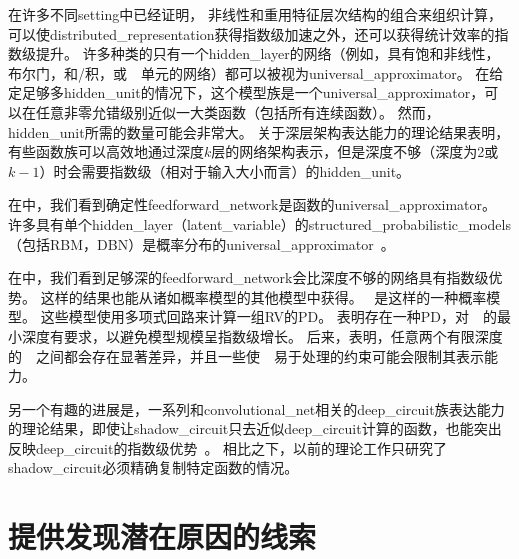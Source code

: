 
在许多不同\gls{setting}中已经证明，
非线性和重用特征层次结构的组合来组织计算，可以使\gls{distributed_representation}获得指数级加速之外，还可以获得统计效率的指数级提升。
许多种类的只有一个\gls{hidden_layer}的网络（例如，具有饱和非线性，布尔门，和/积，或~~单元的网络）都可以被视为\gls{universal_approximator}。
在给定足够多\gls{hidden_unit}的情况下，这个模型族是一个\gls{universal_approximator}，可以在任意非零允错级别近似一大类函数（包括所有连续函数）。
然而，\gls{hidden_unit}所需的数量可能会非常大。
关于深层架构表达能力的理论结果表明，有些函数族可以高效地通过深度$k$层的网络架构表示，但是深度不够（深度为2或$k-1$）时会需要指数级（相对于输入大小而言）的\gls{hidden_unit}。



在中，我们看到确定性\gls{feedforward_network}是函数的\gls{universal_approximator}。
许多具有单个\gls{hidden_layer}（\gls{latent_variable}）的\gls{structured_probabilistic_models}（包括\gls{RBM}，\gls{DBN}）是概率分布的\gls{universal_approximator}~\citep{LeRoux-Bengio-2007-TR,LeRoux-Bengio-2010,Montufar-2011,Montufar2014,Krause-et-al-ICML2013}。


在中，我们看到足够深的\gls{feedforward_network}会比深度不够的网络具有指数级优势。
这样的结果也能从诸如概率模型的其他模型中获得。
~\citep{Poon+Domingos-2011}是这样的一种概率模型。
这些模型使用多项式回路来计算一组\gls{RV}的\gls{PD}。
\cite{Delalleau+Bengio-2011-small}表明存在一种\gls{PD}，对~~的最小深度有要求，以避免模型规模呈指数级增长。
后来，\cite{Martens+Medabalimi-arxiv2014}表明，任意两个有限深度的~~之间都会存在显著差异，并且一些使~~易于处理的约束可能会限制其表示能力。


另一个有趣的进展是，一系列和\gls{convolutional_net}相关的\gls{deep_circuit}族表达能力的理论结果，即使让\gls{shadow_circuit}只去近似\gls{deep_circuit}计算的函数，也能突出反映\gls{deep_circuit}的指数级优势~\citep{Cohen-et-al-arXiv2015}。
相比之下，以前的理论工作只研究了\gls{shadow_circuit}必须精确复制特定函数的情况。


\section{提供发现潜在原因的线索}
\label{sec:providing_clues_to_discover_underlying_causes}

